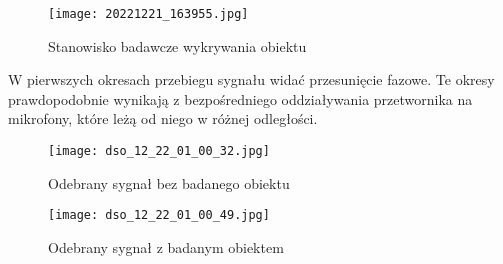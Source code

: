 \begin{figure}[!ht]
    \centering
    \texttt{[image: 20221221\_163955.jpg]}
    \caption{Stanowisko badawcze wykrywania obiektu}
    \label{fig:stanowisko}
\end{figure}

W pierwszych okresach przebiegu sygnału widać przesunięcie fazowe. 
Te okresy prawdopodobnie wynikają z bezpośredniego oddziaływania przetwornika na mikrofony, które leżą od niego w różnej odległości.  


\begin{figure}[!ht]
    \centering
    \texttt{[image: dso\_12\_22\_01\_00\_32.jpg]}
    \caption{Odebrany sygnał bez badanego obiektu}
    \label{fig:bezobiektu}
\end{figure}

\begin{figure}[!ht]
    \centering
    \texttt{[image: dso\_12\_22\_01\_00\_49.jpg]}
    \caption{Odebrany sygnał z badanym obiektem}
    \label{fig:zobiektem}
\end{figure}

